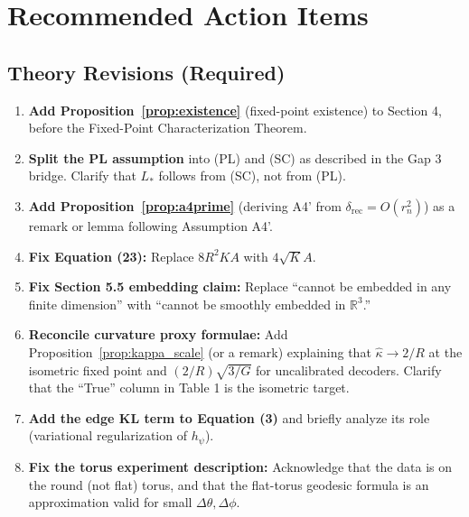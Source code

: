 \documentclass[11pt]{article}
\newcommand{\R}{\mathbb{R}}
\begin{document}
\section{Recommended Action Items}

\subsection{Theory Revisions (Required)}

\begin{enumerate}
\item \textbf{Add Proposition~\ref{prop:existence}} (fixed-point existence) to
Section 4, before the Fixed-Point Characterization Theorem.

\item \textbf{Split the PL assumption} into (PL) and (SC) as described in the
Gap 3 bridge. Clarify that $L_*$ follows from (SC), not from (PL).

\item \textbf{Add Proposition~\ref{prop:a4prime}} (deriving A4' from
$\delta_{\mathrm{rec}} = O(r_n^2)$) as a remark or lemma following Assumption A4'.

\item \textbf{Fix Equation (23):} Replace $8R^2 K A$ with $4\sqrt{K} A$.

\item \textbf{Fix Section 5.5 embedding claim:} Replace ``cannot be embedded in
any finite dimension'' with ``cannot be smoothly embedded in $\R^3$.''

\item \textbf{Reconcile curvature proxy formulae:} Add
Proposition~\ref{prop:kappa_scale} (or a remark) explaining that $\hat\kappa
\to 2/R$ at the isometric fixed point and $(2/R)\sqrt{3/G}$ for uncalibrated
decoders. Clarify that the ``True'' column in Table 1 is the isometric target.

\item \textbf{Add the edge KL term to Equation (3)} and briefly analyze its
role (variational regularization of $h_\psi$).

\item \textbf{Fix the torus experiment description:} Acknowledge that the data
is on the round (not flat) torus, and that the flat-torus geodesic formula is
an approximation valid for small $\Delta\theta, \Delta\phi$.
\end{enumerate}
\end{document}
